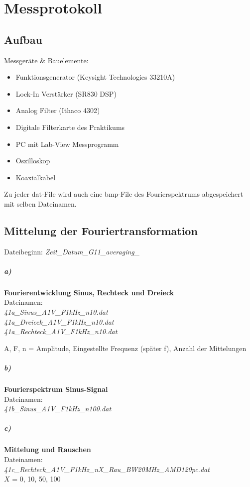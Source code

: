 
\chapter{Messprotokoll}
\label{chap:protokoll}
\section*{Aufbau}
Messgeräte \& Bauelemente:
\begin{itemize}
    \item Funktionsgenerator (Keysight Technologies 33210A)
    \item Lock-In Verstärker (SR830 DSP)
    \item Analog Filter (Ithaco 4302)
    \item Digitale Filterkarte des Praktikums
    \item PC mit Lab-View Messprogramm
    \item Oszilloskop
    \item Koaxialkabel
\end{itemize}
Zu jeder dat-File wird auch eine bmp-File des Fourierspektrums abgespeichert mit selben Dateinamen.
\section*{Mittelung der Fouriertransformation}
Dateibeginn: \textit{Zeit\_Datum\_G11\_averaging\_}
\paragraph{a)}\textbf{Fourierentwicklung Sinus, Rechteck und Dreieck}\\
Dateinamen:\\
\textit{41a\_Sinus\_A1V\_F1kHz\_n10.dat}\\
\textit{41a\_Dreieck\_A1V\_F1kHz\_n10.dat}\\
\textit{41a\_Rechteck\_A1V\_F1kHz\_n10.dat}

A, F, n = Amplitude, Eingestellte Frequenz (später f), Anzahl der Mittelungen

\paragraph{b)}\textbf{Fourierspektrum Sinus-Signal}\\
Dateinamen:\\
\textit{41b\_Sinus\_A1V\_F1kHz\_n100.dat}

\paragraph{c)}\textbf{Mittelung und Rauschen}\\
Dateinamen:\\ 
\textit{41c\_Rechteck\_A1V\_F1kHz\_nX\_Rau\_BW20MHz\_AMD120pc.dat}\\
$X$ = 0, 10, 50, 100

